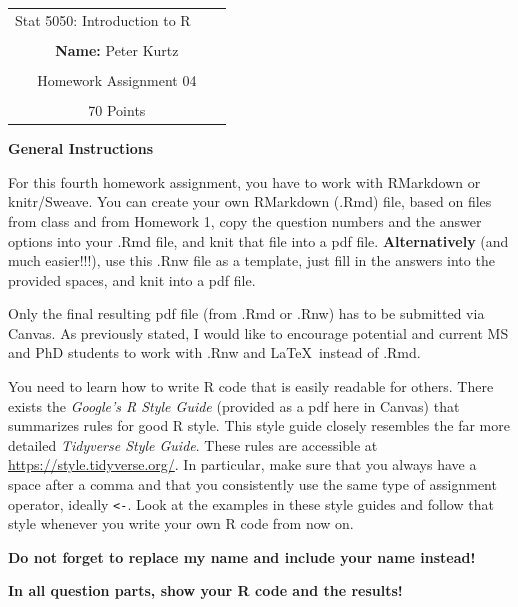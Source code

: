 \documentclass[12pt,letterpaper,final]{article}\usepackage[]{graphicx}\usepackage[]{xcolor}
\begin{document}
\begin{table}\centering
\begin{tabular*}{6.15in}{@{\extracolsep{\fill}}|llr|} \hline
Stat 5050: Introduction to R \\
 & & \\
\multicolumn{3}{|c|}{
{\bf Name:} Peter Kurtz} \\
 & & \\
\multicolumn{3}{|c|}{
Homework Assignment 04} \\
 & & \\
\multicolumn{3}{|c|}{
70 Points } \\
\hline
\end{tabular*}
\end{table}


{\bf General Instructions}

For this fourth homework assignment, you have to work with RMarkdown or knitr/Sweave.
You can create your own RMarkdown (.Rmd) file,
based on files from class and from Homework 1, copy the
question numbers and the answer options into your .Rmd file, 
and knit that file into a pdf file. 
{\bf Alternatively} (and much easier!!!), use this .Rnw file as a 
template, just fill in the answers into the provided spaces,
and knit into a pdf file.

Only the final resulting pdf file (from .Rmd or .Rnw) has to be submitted via Canvas.
As previously stated, I would like to encourage potential and current MS and PhD students
to work with .Rnw and \LaTeX\ instead of .Rmd.

You need to learn how to write R code that is easily readable for others. There exists the
{\it Google's R Style Guide} (provided as a pdf here in Canvas)
that summarizes rules for good R style. 
This style guide closely resembles the far more detailed
{\it Tidyverse Style Guide}.
These rules
are accessible at
\url{https://style.tidyverse.org/}.
In particular, make sure that you always have a space after a comma and that you
consistently use the same type of assignment operator, ideally \verb|<-|.
Look at the examples in these style guides and follow that style whenever you
write your own R code from now on.

{\bf Do not forget to replace my name and include your name instead!}

{\bf In all question parts, show your R code and the results!}

 
 
\newpage
\end{document}
